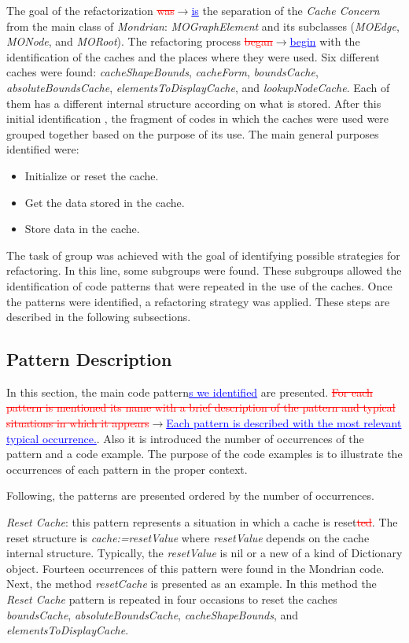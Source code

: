 \documentclass[runningheads]{llncs}
\newcommand{\ra}{$\rightarrow$}
\newcommand{\ins}[1]{\textcolor{blue}{\uline{#1}}} %
\newcommand{\del}[1]{\textcolor{red}{\sout{#1}}} %
\newcommand{\chg}[2]{\textcolor{red}{\sout{#1}}{\ra}\textcolor{blue}{\uline{#2}}} %
\newcommand{\ab}[1]{\nb{Alexandre}{blue}{#1}}
\begin{document}
The goal of the refactorization \chg{was}{is} the separation of the \emph{Cache
Concern} from the main class of \emph{Mondrian}: \emph{MOGraphElement}
and its subclasses (\emph{MOEdge}, \emph{MONode}, and \emph{MORoot}).
The refactoring process \chg{began}{begin} with the identification of the caches
and the places where they were used. Six different caches were found:
\emph{cacheShapeBounds}, \emph{cacheForm}, \emph{boundsCache}, \emph{absoluteBoundsCache},
\emph{elementsToDisplayCache}, and \emph{lookupNodeCache}. Each of
them has a different internal structure according on what is stored.
After this initial identification \ab{How do you identified your CC?}, the fragment of codes in which
the caches were used were grouped together based on the purpose of
its use. The main general purposes identified were:
\begin{itemize}
\item Initialize or reset the cache.
\item Get the data stored in the cache.
\item Store data in the cache.
\end{itemize}
The task of group was achieved with the goal of identifying possible
strategies for refactoring. In this line, some subgroups were found.
These subgroups allowed the identification of code patterns that were
repeated in the use of the caches. Once the patterns were identified,
a refactoring strategy was applied. These steps are described in the
following subsections.


\subsection{Pattern Description\label{sub:Pattern-Identification}}

In this section, the main code pattern\ins{s we identified} are presented. \chg{For each pattern
is mentioned its name with a brief description of the pattern and
typical situations in which it appears}{Each pattern is described with the most relevant typical occurrence.}. Also it is introduced the
number of occurrences of the pattern and a code example. The purpose
of the code examples is to illustrate the occurrences of each pattern
in the proper context. 

Following, the patterns are presented ordered by the number of occurrences.

\emph{Reset Cache}: this pattern represents a situation in which a
cache is reset\del{ted}. The reset structure is \emph{cache:=resetValue}
where \emph{resetValue} depends on the cache internal structure. Typically,
the \emph{resetValue} is nil or a new of a kind of Dictionary object.
Fourteen occurrences of this pattern were found in the Mondrian code.
Next, the method \emph{resetCache} is presented as an example. In
this method the \emph{Reset Cache} pattern is repeated in four occasions
to reset the caches \emph{boundsCache}, \emph{absoluteBoundsCache},
\emph{cacheShapeBounds}, and \emph{elementsToDisplayCache}.
\end{document}
